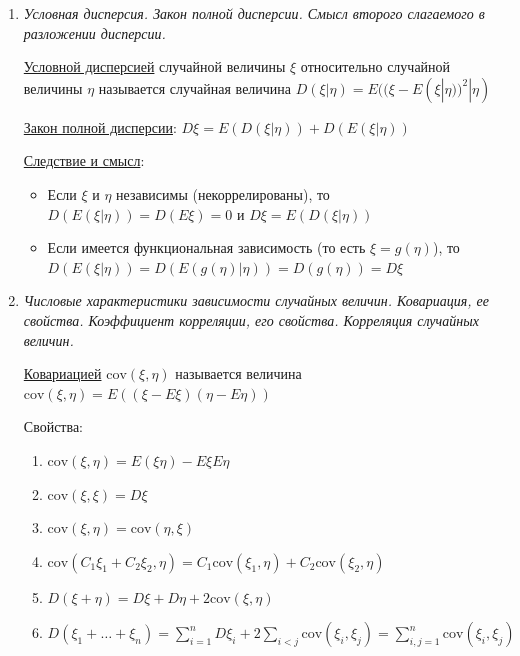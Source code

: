 \begin{enumerate}
    \item \textit{Условная дисперсия. Закон полной дисперсии. Смысл второго слагаемого в разложении дисперсии.}

    \hyperlink{conditionalvariance}{Условной дисперсией} случайной величины $\xi$ относительно случайной величины $\eta$ называется случайная величина 
    $D(\xi | \eta) = E((\xi - E(\xi | \eta))^2 | \eta)$
    
    \hyperlink{lawoffullvariance}{Закон полной дисперсии}: \Ths $D\xi = E(D(\xi | \eta)) + D(E(\xi | \eta))$

    \underline{Следствие и смысл}: 
    
    \begin{itemize}
        \item Если $\xi$ и $\eta$ независимы (некоррелированы), то $D(E(\xi | \eta)) = D(E\xi) = 0$ и $D\xi = E(D(\xi | \eta))$

        \item Если имеется функциональная зависимость (то есть $\xi = g(\eta)$), то $D(E(\xi | \eta)) = D(E(g(\eta) | \eta)) = 
        D(g(\eta)) = D\xi$
    \end{itemize}

    \item \textit{Числовые характеристики зависимости случайных величин. Ковариация, ее свойства. Коэффициент корреляции, его свойства. Корреляция случайных величин.}

    \hyperlink{covariance}{Ковариацией} $\mathrm{cov}(\xi, \eta)$ называется величина $\mathrm{cov}(\xi, \eta) = E((\xi - E\xi)(\eta - E\eta))$

    Свойства:

    \begin{enumerate}
        \item $\mathrm{cov} (\xi, \eta) = E(\xi\eta) - E\xi E\eta$

        \item $\mathrm{cov} (\xi, \xi) = D\xi$

        \item $\mathrm{cov}(\xi, \eta) = \mathrm{cov}(\eta, \xi)$

        \item $\mathrm{cov}(C_1 \xi_1 + C_2 \xi_2, \eta) = C_1 \mathrm{cov}(\xi_1, \eta) + C_2 \mathrm{cov}(\xi_2, \eta)$

        \item $D(\xi + \eta) = D\xi + D\eta + 2\mathrm{cov}(\xi, \eta)$

        \item $D(\xi_1 + \dots + \xi_n) = \sum_{i = 1}^n D\xi_i + 2\sum_{i < j} \mathrm{cov}(\xi_i, \xi_j) = \sum_{i, j = 1}^{n} \mathrm{cov}(\xi_i, \xi_j)$


\end{enumerate}
\end{enumerate}
